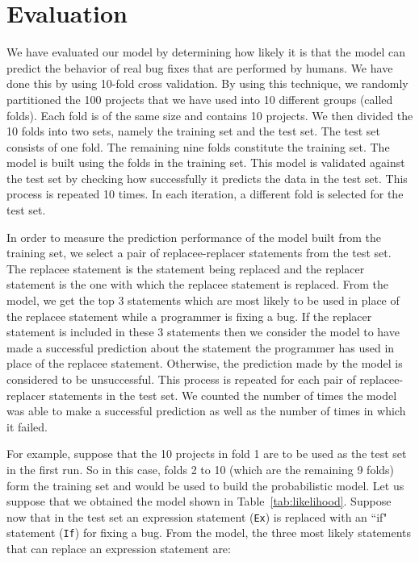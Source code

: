 
\section{Evaluation}\label{sec:stmtstudy}
We have evaluated our model by determining how likely it is that the model can predict the behavior of real bug fixes that are performed by humans.
We have done this by using 10-fold cross validation. By using this technique, we randomly partitioned the 100 projects that we have used into 10 different groups (called folds). Each fold is of the same size and contains 10 projects. We then divided the 10 folds into two sets, namely the training set and the test set. The test set consists of one fold. The remaining nine folds constitute the training set. The model is built using the folds in the training set. This model is validated against the test set by checking how successfully it predicts the data in the test set. This process is repeated 10 times. In each iteration, a different fold is selected for the test set.

In order to measure the prediction performance of the model built from the training set, we select a pair of replacee-replacer statements from the test set. The replacee statement is the statement being replaced and the replacer statement is the one with which the replacee statement is replaced. From the model, we get the top 3 statements which are most likely to be used in place of the replacee statement while a programmer is fixing a bug. If the replacer statement is included in these 3 statements then we consider the model to have made a successful prediction about the statement the programmer has used in place of the replacee statement. Otherwise, the prediction made by the model is considered to be unsuccessful. This process is repeated for each pair of replacee-replacer statements in the test set. We counted the number of times the model was able to make a successful prediction as well as the number of times in which it failed.

For example, suppose that the 10 projects in fold 1 are to be used as the test set in the first run.
So in this case, folds 2 to 10 (which are the remaining 9 folds) form the training set and would be used to build the probabilistic model. Let us suppose that we obtained the model shown in Table~\ref{tab:likelihood}. Suppose now that in the test set an expression statement (\texttt{Ex}) is replaced with an ``if" statement (\texttt{If}) for fixing a bug. From the model, the three most likely statements that can replace an expression statement are:

